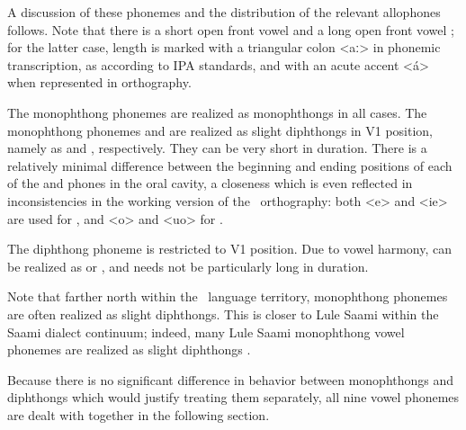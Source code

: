 A discussion of these phonemes and the distribution of the relevant allophones follows. 
Note that there is a short open front vowel  and a long open front vowel ; for the latter case, length is marked with a triangular colon <aː> in phonemic transcription, as according to IPA standards, and with an acute accent <á> when represented in orthography.

The monophthong phonemes  are realized as monophthongs in all cases. 
The monophthong phonemes  and  are realized as slight diphthongs in V1 position, namely as \ipa{[i͡e]} and \ipa{[u͡o]}, %
respectively. They can be very short in duration. There is a relatively minimal difference between the beginning and ending positions of each of the \ipa{[i͡e]} and \ipa{[u͡o]} phones in the oral cavity, a closeness which is even reflected in inconsistencies in the working version of the \PS\ orthography: both <e> and <ie> are used for , and <o> and <uo> for . 

The diphthong phoneme  is restricted to V1 position. Due to vowel harmony,  can be realized as \ipa{[ʊ͡ɛ]} or \ipa{[ʊ͡a]}, and needs not be particularly long in duration. 

Note that farther north within the \PS\ language territory, monophthong phonemes are often realized as slight diphthongs. This is closer to Lule Saami within the Saami dialect continuum; indeed, many Lule Saami monophthong vowel phonemes are realized as slight diphthongs \citep[cf., e.g.,~][11]{Spiik1989}. 

Because there is no significant difference in behavior between monophthongs and diphthongs which would justify treating them separately, all nine vowel phonemes are dealt with together in the following section.


